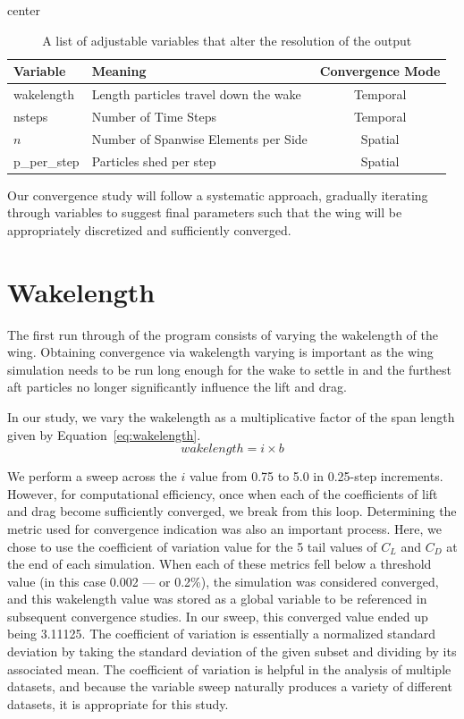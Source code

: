 \documentclass{report}
\begin{document}
\begin{table}[H]
    \centering
    \caption{A list of adjustable variables that alter the resolution of the output}\label{tab:adjustables}
    \begin{adjustbox}{center}
    \begin{tabular}{l l c}
        \toprule
        \textbf{Variable} & \textbf{Meaning} & \textbf{Convergence Mode} \\
        \midrule
        wakelength & Length particles travel down the wake & Temporal \\
        nsteps & Number of Time Steps & Temporal \\
        $n$ & Number of Spanwise Elements per Side & Spatial \\
        p\_per\_step & Particles shed per step & Spatial \\
        \bottomrule
    \end{tabular}
    \end{adjustbox}
\end{table}

Our convergence study will follow a systematic approach, gradually iterating through variables to suggest final parameters such that the wing will be appropriately discretized and sufficiently converged.

\section{Wakelength}
The first run through of the program consists of varying the wakelength of the wing. Obtaining convergence via wakelength varying is important as the wing simulation needs to be run long enough for the wake to settle in and the furthest aft particles no longer significantly influence the lift and drag.

In our study, we vary the wakelength as a multiplicative factor of the span length given by Equation~\ref{eq:wakelength}. 
\begin{equation}\label{eq:wakelength}
wakelength = i \times{} b
\end{equation}

We perform a sweep across the $i$ value from 0.75 to 5.0 in 0.25-step increments. However, for computational efficiency, once when each of the coefficients of lift and drag become sufficiently converged, we break from this loop.
Determining the metric used for convergence indication was also an important process. Here, we chose to use the coefficient of variation value for the 5 tail values of $C_L$ and $C_D$ at the end of each simulation.
When each of these metrics fell below a threshold value (in this case 0.002 --- or 0.2\%), the simulation was considered converged, and this wakelength value was stored as a global variable to be referenced in subsequent convergence studies.
In our sweep, this converged value ended up being 3.11125.
The coefficient of variation is essentially a normalized standard deviation by taking the standard deviation of the given subset and dividing by its associated mean. 
The coefficient of variation is helpful in the analysis of multiple datasets, and because the variable sweep naturally produces a variety of different datasets, it is appropriate for this study.
\end{document}
